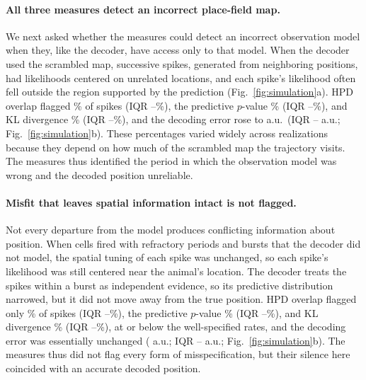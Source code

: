 \documentclass[12pt]{article}
\begin{document}
\paragraph{All three measures detect an incorrect place-field map.} We next asked whether the measures could detect an incorrect observation model when they, like the decoder, have access only to that model. When the decoder used the scrambled map, successive spikes, generated from neighboring positions, had likelihoods centered on unrelated locations, and each spike's likelihood often fell outside the region supported by the prediction (Fig.~\ref{fig:simulation}a). HPD overlap flagged \SimFlagRemapHpd\% of spikes (IQR \SimFlagRemapHpdQuartileLow--\SimFlagRemapHpdQuartileHigh\%), the predictive $p$-value \SimFlagRemapPvalue\% (IQR \SimFlagRemapPvalueQuartileLow--\SimFlagRemapPvalueQuartileHigh\%), and KL divergence \SimFlagRemapKl\% (IQR \SimFlagRemapKlQuartileLow--\SimFlagRemapKlQuartileHigh\%), and the decoding error rose to \SimRemapError{} a.u.\ (IQR \SimRemapErrorQuartileLow--\SimRemapErrorQuartileHigh{} a.u.; Fig.~\ref{fig:simulation}b). These percentages varied widely across realizations because they depend on how much of the scrambled map the trajectory visits. The measures thus identified the period in which the observation model was wrong and the decoded position unreliable.

\paragraph{Misfit that leaves spatial information intact is not flagged.} Not every departure from the model produces conflicting information about position. When cells fired with refractory periods and bursts that the decoder did not model, the spatial tuning of each spike was unchanged, so each spike's likelihood was still centered near the animal's location. The decoder treats the spikes within a burst as independent evidence, so its predictive distribution narrowed, but it did not move away from the true position. HPD overlap flagged only \SimFlagHistoryHpd\% of spikes (IQR \SimFlagHistoryHpdQuartileLow--\SimFlagHistoryHpdQuartileHigh\%), the predictive $p$-value \SimFlagHistoryPvalue\% (IQR \SimFlagHistoryPvalueQuartileLow--\SimFlagHistoryPvalueQuartileHigh\%), and KL divergence \SimFlagHistoryKl\% (IQR \SimFlagHistoryKlQuartileLow--\SimFlagHistoryKlQuartileHigh\%), at or below the well-specified rates, and the decoding error was essentially unchanged (\SimHistoryError{} a.u.; IQR \SimHistoryErrorQuartileLow--\SimHistoryErrorQuartileHigh{} a.u.; Fig.~\ref{fig:simulation}b). The measures thus did not flag every form of misspecification, but their silence here coincided with an accurate decoded position.
\end{document}
